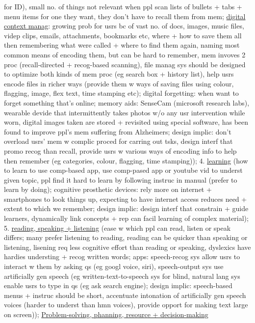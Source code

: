 \documentclass[a4paper]{article}
\begin{document}
\begin{multicols}{3}
        for ID), small no. of things not relevant when ppl scan lists of bullets + tabs + menu items for one they want, they don't have to recall them from mem; \underline{digital context manag}: growing prob for usrs bc of vast
        no. of docs, images, music files, videp clips, emails, attachments, bookmarks etc, where + how to save them all then remembering what were called + where to find them again, naming most common means of encoding them,
        but can be hard to remember, mem invoves 2 proc (recall-directed + recog-based scanning), file manag sys should be designed to optimize both kinds of mem proc (eg search box + history list), help usrs encode files
        in richer ways (provide them w ways of saving files using colour, flagging, image, flex text, time stamping etc); digital forgetting: when want to forget something that's online; memory aids:
        SenseCam (microsoft research labs), wearable devide that intermittently takes photos w/o any usr intervention while worn, digital images taken are stored + revisited using special software, has been found to improve
        ppl's mem suffering from Alzheimers; design implic: don't overload usrs' mem w complic proced for carring out tsks, design interf that promo recog than recall, provide usrs w various ways of encoding
        info to help then remember (eg categories, colour, flagging, time stamping)); 4. \underline{learning} (how to learn to use comp-based app, use comp-pased app or youtube vid to underst given topic,
        ppl find it hard to learn by following instruc in manual (prefer to learn by doing); cognitive prosthetic devices: rely more on internet + smartphones to look things up, expecting to have internet
        access reduces need + extent to which we remember; design implic: design interf that constrain + guide learners, dynamically link concepts + rep can facil learning of complex material); 5.
        \underline{reading, speaking + listening} (ease w which ppl can read, listen or speak differs; many prefer listening to reading, reading can be quicker than speaking or listening, lisening req less cognitive
        effort than reading or speaking, dyslexics have hardies understing + recog written words; apps: speech-recog sys allow usrs to interact w them by asking qs (eg googl voice, siri), speech-output sys
        use artificially gen speech (eg written-text-to-speech sys for blind, natural lang sys enable usrs to type in qs (eg ask search engine); design implic: speech-based menus + instruc should be short, accentuate
        intonation of artificially gen speech voices (harder to underst than hmn voices), provide opport for making text large on screen)); \underline{Problem-solving, phanning, resource + decision-making}

\end{multicols}
\end{document}

